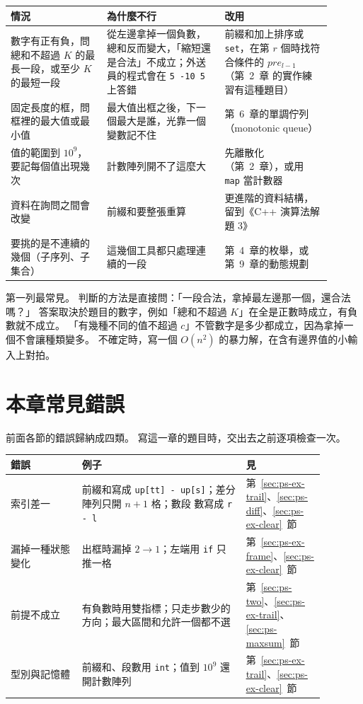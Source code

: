 \begin{center}
\begin{tabular}{p{0.27\linewidth}p{0.33\linewidth}p{0.3\linewidth}}
\toprule
情況 & 為什麼不行 & 改用 \\
\midrule
數字有正有負，問總和不超過 $K$ 的最長一段，或至少 $K$ 的最短一段 &
從左邊拿掉一個負數，總和反而變大，「縮短還是合法」不成立；外送員的程式會在
\texttt{5 -10 5} 上答錯 &
前綴和加上排序或 \texttt{set}，在第 $r$ 個時找符合條件的 $pre_{l-1}$（第~2~章
的實作練習有這種題目） \\
\addlinespace
固定長度的框，問框裡的最大值或最小值 &
最大值出框之後，下一個最大是誰，光靠一個變數記不住 &
第~6~章的單調佇列（monotonic queue） \\
\addlinespace
值的範圍到 $10^9$，要記每個值出現幾次 &
計數陣列開不了這麼大 &
先離散化（第~2~章），或用 \texttt{map} 當計數器 \\
\addlinespace
資料在詢問之間會改變 &
前綴和要整張重算 &
更進階的資料結構，留到《C++ 演算法解題 3》 \\
\addlinespace
要挑的是不連續的幾個（子序列、子集合） &
這幾個工具都只處理連續的一段 &
第~4~章的枚舉，或第~9~章的動態規劃 \\
\bottomrule
\end{tabular}
\end{center}

第一列最常見。 判斷的方法是直接問：「一段合法，拿掉最左邊那一個，還合法嗎？」
答案取決於題目的數字，例如「總和不超過 $K$」在全是正數時成立，有負數就不成立。
「有幾種不同的值不超過 $c$」不管數字是多少都成立，因為拿掉一個不會讓種類變多。
不確定時，寫一個 $O(n^2)$ 的暴力解，在含有邊界值的小輸入上對拍。

\section{本章常見錯誤}
\label{sec:ps-pitfalls}

前面各節的錯誤歸納成四類。 寫這一章的題目時，交出去之前逐項檢查一次。

\begin{center}
\begin{tabular}{p{0.2\linewidth}p{0.46\linewidth}p{0.22\linewidth}}
\toprule
錯誤 & 例子 & 見 \\
\midrule
索引差一 & 前綴和寫成 \texttt{up[tt] - up[s]}；差分陣列只開 $n + 1$ 格；數段
數寫成 \texttt{r - l} &
第~\ref{sec:ps-ex-trail}、\ref{sec:ps-diff}、\ref{sec:ps-ex-clear}~節 \\
漏掉一種狀態變化 & 出框時漏掉 $2 \to 1$；左端用 \texttt{if} 只推一格 &
第~\ref{sec:ps-ex-frame}、\ref{sec:ps-ex-clear}~節 \\
前提不成立 & 有負數時用雙指標；只走步數少的方向；最大區間和允許一個都不選 &
第~\ref{sec:ps-two}、\ref{sec:ps-ex-trail}、\ref{sec:ps-maxsum}~節 \\
型別與記憶體 & 前綴和、段數用 \texttt{int}；值到 $10^9$ 還開計數陣列 &
第~\ref{sec:ps-ex-trail}、\ref{sec:ps-ex-clear}~節 \\
\bottomrule
\end{tabular}
\end{center}

